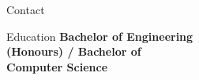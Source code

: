 \documentclass{custom-resume}
\begin{document}
\selectfont



\TitleRule
\vspace{-6pt} %

\hspace{-2cm} %
\colorbox{grey0}{
\begin{minipage}[t][23cm]{0.39\textwidth}


  \hspace{1.6cm}  %
  \begin{minipage}[t][23cm]{0.64\textwidth}

    \raggedright

    \vspace{6pt} %


    \begin{section}{Contact}
    \end{section}


    \begin{section}{Education}
      {
        \small
        \textbf{Bachelor of Engineering\\ (Honours) / Bachelor of\\ Computer Science}
      } \\[8pt]


\end{section}
\end{minipage}
\end{minipage}}
\end{document}

